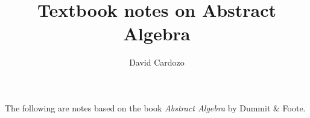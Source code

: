 \documentclass[notitlepage]{report}
\author{David Cardozo}
\title{Textbook notes on Abstract Algebra}
\begin{document}
\maketitle
The following are notes based on the book \textit{Abstract Algebra} by Dummit \& Foote.
	
\end{document}
